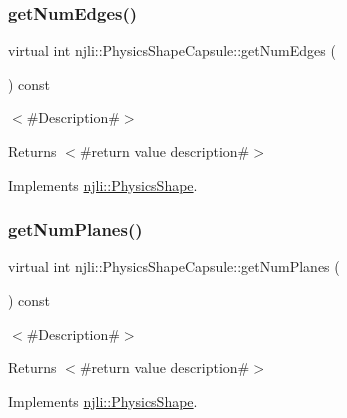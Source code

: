\subsubsection{\texorpdfstring{get\+Num\+Edges()}{getNumEdges()}}
{\footnotesize\ttfamily virtual int njli\+::\+Physics\+Shape\+Capsule\+::get\+Num\+Edges (\begin{DoxyParamCaption}{ }\end{DoxyParamCaption}) const\hspace{0.3cm}{\ttfamily [virtual]}}

$<$\#\+Description\#$>$

\begin{DoxyReturn}{Returns}
$<$\#return value description\#$>$ 
\end{DoxyReturn}


Implements \mbox{\hyperlink{classnjli_1_1_physics_shape_a24df999ba2b7ac0d9abda09c4f17c2fe}{njli\+::\+Physics\+Shape}}.

\mbox{\label{classnjli_1_1_physics_shape_capsule_aa0b34e9bbff704708da44cfae05e0579}} 
\subsubsection{\texorpdfstring{get\+Num\+Planes()}{getNumPlanes()}}
{\footnotesize\ttfamily virtual int njli\+::\+Physics\+Shape\+Capsule\+::get\+Num\+Planes (\begin{DoxyParamCaption}{ }\end{DoxyParamCaption}) const\hspace{0.3cm}{\ttfamily [virtual]}}

$<$\#\+Description\#$>$

\begin{DoxyReturn}{Returns}
$<$\#return value description\#$>$ 
\end{DoxyReturn}


Implements \mbox{\hyperlink{classnjli_1_1_physics_shape_a11cb80220393bfce177b8bdc34f7f359}{njli\+::\+Physics\+Shape}}.

\mbox{\label{classnjli_1_1_physics_shape_capsule_af85b2258d5ab0b0ac1dbe88419c32fd9}} 
